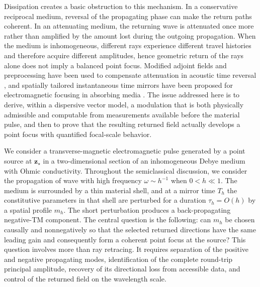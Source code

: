 \documentclass[11pt,reqno]{amsart}
\numberwithin{equation}{section}
\begin{document}
Dissipation creates a basic obstruction to this mechanism. In a conservative reciprocal medium, reversal of the propagating phase can make the return paths coherent. In an attenuating medium, the returning wave is attenuated once more rather than amplified by the amount lost during the outgoing propagation. When the medium is inhomogeneous, different rays experience different travel histories and therefore acquire different amplitudes, hence geometric return of the rays alone does not imply a balanced point focus. Modified adjoint fields and preprocessing have been used to compensate attenuation in acoustic time reversal \cite{AmmariBretinGarnierWahab2011}, and spatially tailored
instantaneous time mirrors have been proposed for electromagnetic focusing in absorbing media \cite{WuNobreFortRileyCosten2022}. The issue addressed here is to derive, within a dispersive vector model, a modulation that is both physically admissible and computable from measurements available before the material pulse, and then to prove that the resulting returned field actually develops a point focus with quantified focal-scale behavior.

We consider a transverse-magnetic electromagnetic pulse generated by a point source at $\bm z_\star$ in a two-dimensional section of an inhomogeneous Debye medium with Ohmic conductivity. Throughout the semiclassical discussion, we consider the propagation of wave with high frequency $\omega\sim h^{-1}$ when $0<h\ll 1$. The medium is surrounded by a thin material shell, and at a mirror time $T_h$ the constitutive parameters in that shell are perturbed for a duration $\tau_h=O(h)$ by a spatial profile $m_h$. The short perturbation produces a back-propagating negative-TM component. The central question is the following: can $m_h$ be chosen causally and nonnegatively so that the selected returned directions have the same leading gain and consequently form a coherent point focus at the source? This question involves more than ray retracing. It requires separation of the positive and negative propagating modes, identification of the complete round-trip principal amplitude, recovery of its directional loss from accessible data, and control of the returned field on the wavelength scale.
\end{document}
